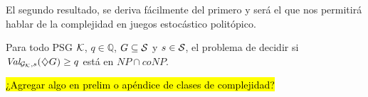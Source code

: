 El segundo resultado, se deriva fácilmente del primero y será el que nos
permitirá hablar de la complejidad en juegos estocástico politópico.

\begin{theorem}
	Para todo PSG $\mathcal{K}$, $q \in \mathbb{Q}$, $G \subseteq \mathcal{S}$ y $s \in \mathcal{S}$, el problema de decidir si $\textit{Val}_{\mathcal{G}_{\mathcal{K}}, s}(\diamondsuit G) \geq q$ está en $NP \cap coNP$.
\end{theorem}

\hl{¿Agregar algo en prelim o apéndice de clases de complejidad?}



